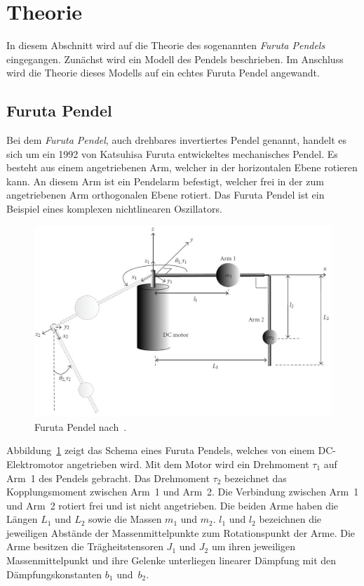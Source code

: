 \section{Theorie}
\label{sec.Theorie}
In diesem Abschnitt wird auf die Theorie des sogenannten \emph{Furuta Pendels} eingegangen. Zunächst wird ein Modell des Pendels beschrieben. Im Anschluss wird die Theorie dieses Modells auf ein echtes Furuta Pendel angewandt. %

\subsection{Furuta Pendel}
\label{sub.Furuta-Pendel}
Bei dem \emph{Furuta Pendel}, auch drehbares invertiertes Pendel genannt, handelt es sich um ein 1992 von Katsuhisa Furuta entwickeltes mechanisches Pendel. 
Es besteht aus einem angetriebenen Arm, welcher in der horizontalen Ebene rotieren kann. 
An diesem Arm ist ein Pendelarm befestigt, welcher frei in der zum angetriebenen Arm orthogonalen Ebene rotiert. 
Das Furuta Pendel ist ein Beispiel eines komplexen nichtlinearen Oszillators. \citep{Cazzolato.2011}

\begin{figure}[htbp]
	\centering
	\includegraphics[width=1.\textwidth]{Grafiken/furuta3.jpg}
	\caption{Furuta Pendel nach~\cite{Cazzolato.2011}. }
	\label{fig.furuta-schematic}
\end{figure}

Abbildung~\ref{fig.furuta-schematic} zeigt das Schema eines Furuta Pendels, welches von einem DC-Elektromotor angetrieben wird.
Mit dem Motor wird ein Drehmoment $\tau_1$ auf Arm~1 des Pendels gebracht. 
Das Drehmoment $\tau_2$ bezeichnet das Kopplungsmoment zwischen Arm~1 und Arm~2. 
Die Verbindung zwischen Arm~1 und Arm~2 rotiert frei und ist nicht angetrieben.
Die beiden Arme haben die Längen $L_1$ und $L_2$ sowie die Massen $m_1$ und $m_2$.
$l_1$ und $l_2$ bezeichnen die jeweiligen Abstände der Massenmittelpunkte zum Rotationspunkt der Arme.
Die Arme besitzen die Trägheitstensoren $J_1$ und $J_2$ um ihren jeweiligen Massenmittelpunkt und ihre Gelenke unterliegen linearer Dämpfung mit den Dämpfungskonstanten $b_1$ und~$b_2$.

